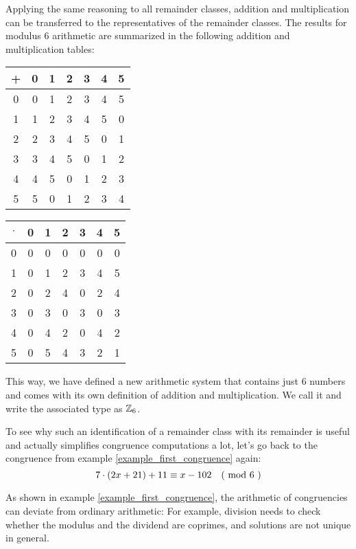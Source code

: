 \begin{example} 
Applying the same reasoning to all remainder classes, addition and multiplication can  be transferred to the representatives of the remainder classes. The results for modulus $6$ arithmetic are summarized in the following addition and multiplication tables:
\begin{center}
  \begin{tabular}{c | c c c c c c}
    + & 0 & 1 & 2 & 3 & 4 & 5\\\hline
    0 & 0 & 1 & 2 & 3 & 4 & 5 \\
    1 & 1 & 2 & 3 & 4 & 5 & 0\\
    2 & 2 & 3 & 4 & 5 & 0 & 1\\
    3 & 3 & 4 & 5 & 0 & 1 & 2\\
    4 & 4 & 5 & 0 & 1 & 2 & 3\\
    5 & 5 & 0 & 1 & 2 & 3 & 4
  \end{tabular} \quad \quad \quad \quad
  \begin{tabular}{c | c c c c c c}
$ \cdot $ & 0 & 1 & 2 & 3 & 4 & 5 \\\hline
        0 & 0 & 0 & 0 & 0 & 0 & 0\\
        1 & 0 & 1 & 2 & 3 & 4 & 5\\
        2 & 0 & 2 & 4 & 0 & 2 & 4\\
        3 & 0 & 3 & 0 & 3 & 0 & 3\\
        4 & 0 & 4 & 2 & 0 & 4 & 2\\
        5 & 0 & 5 & 4 & 3 & 2 & 1
  \end{tabular}
\end{center}
This way, we have defined a new arithmetic system that contains just $6$ numbers and comes with its own definition of addition and multiplication. We call it  and write the associated type as $\mathbb{Z}_6$.

To see why such an identification of a remainder class with its remainder is useful and actually simplifies congruence computations a lot, let's go back to the congruence from example \ref{example_first_congruence} again:
\begin{equation}
\label{example_congruence_two_1}
7\cdot(2x+21) + 11 \equiv x-102 \quad \text{( mod } 6 \text{ )}
\end{equation}

As shown in example \ref{example_first_congruence}, the arithmetic of congruencies can deviate from ordinary arithmetic: For example, division needs to check whether the modulus and the dividend are coprimes, and solutions are not unique in general.


\end{example}
